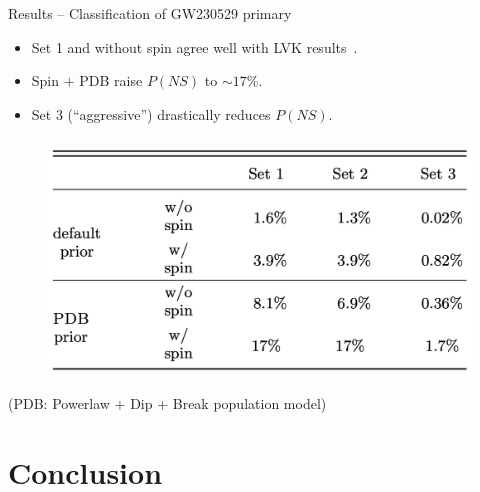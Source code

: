 \documentclass[usenames,dvipsnames,t]{beamer}
\begin{document}
\begin{frame}{Results -- Classification of GW230529 primary}

  \def\x{2mm}

  \begin{itemize}
    \vspace{\x}
    \item Set 1 and without spin agree well with LVK results~\cite{LIGOScientific:2024elc}. 

    \vspace{\x}

    \item Spin $+$ \textsc{PDB} raise $P(NS)$ to $\sim 17\%$.

    \vspace{\x}

    \item Set 3 (``aggressive'') drastically reduces $P(NS)$.
  \end{itemize}

  \begin{figure}
    \centering
    \includegraphics[width=0.7\linewidth]{Figures/extreme_matter_P_ns_table.jpg}
  \end{figure}
  \footnotesize
  \begin{center} 
    (\textsc{PDB}: Powerlaw + Dip + Break population model) 
  \end{center}
  \normalsize


\end{frame}


\section{Conclusion}
\end{document}
